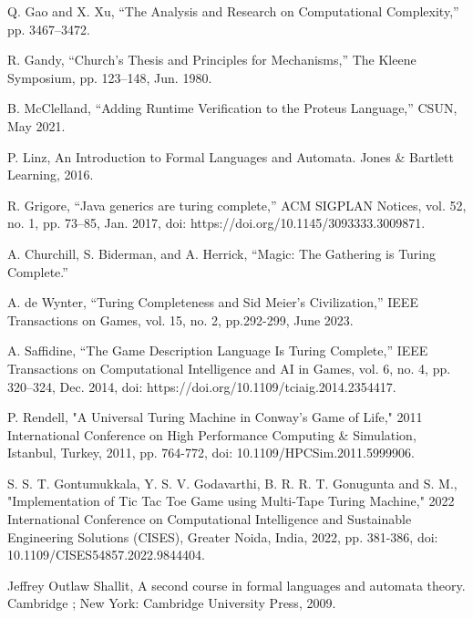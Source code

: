\documentclass[12pt]{report} %
\begin{document}
    \begin{singlespace}

        \begin{thebibliography}{}

             Q. Gao and X. Xu, “The Analysis and Research on Computational Complexity,” pp. 3467–3472.

             R. Gandy, “Church’s Thesis and Principles for Mechanisms,” The Kleene Symposium, pp. 123–148, Jun. 1980.

             B. McClelland, “Adding Runtime Verification to the Proteus Language,” CSUN, May 2021.

             P. Linz, An Introduction to Formal Languages and Automata. Jones \& Bartlett Learning, 2016.

             R. Grigore, “Java generics are turing complete,” ACM SIGPLAN Notices, vol. 52, no. 1, pp. 73–85, Jan. 2017, doi: https://doi.org/10.1145/3093333.3009871.

             A. Churchill, S. Biderman, and A. Herrick, “Magic: The Gathering is Turing Complete.”

             A. de Wynter, “Turing Completeness and Sid Meier’s Civilization,” IEEE Transactions on Games, vol. 15, no. 2, pp.292-299, June 2023.

             A. Saffidine, “The Game Description Language Is Turing Complete,” IEEE Transactions on Computational Intelligence and AI in Games, vol. 6, no. 4, pp. 320–324, Dec. 2014, doi: https://doi.org/10.1109/tciaig.2014.2354417.

             P. Rendell, "A Universal Turing Machine in Conway's Game of Life," 2011 International Conference on High Performance Computing \& Simulation, Istanbul, Turkey, 2011, pp. 764-772, doi: 10.1109/HPCSim.2011.5999906.
        
             S. S. T. Gontumukkala, Y. S. V. Godavarthi, B. R. R. T. Gonugunta and S. M., "Implementation of Tic Tac Toe Game using Multi-Tape Turing Machine," 2022 International Conference on Computational Intelligence and Sustainable Engineering Solutions (CISES), Greater Noida, India, 2022, pp. 381-386, doi: 10.1109/CISES54857.2022.9844404.

             Jeffrey Outlaw Shallit, A second course in formal languages and automata theory. Cambridge ; New York: Cambridge University Press, 2009.


\end{thebibliography}
\end{singlespace}
\end{document}
